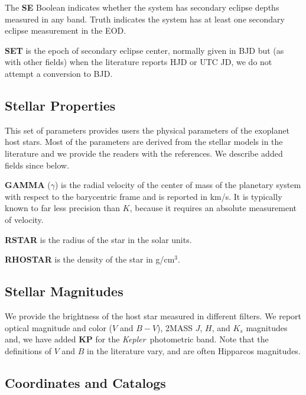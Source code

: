 \documentclass[11pt,preprint]{aastex}
\def\kepler{\textit{Kepler}}
\begin{document}
\begin{CJK*}{UTF8}{gbsn}
The {\bf SE} Boolean indicates whether the system has secondary
eclipse depths measured in any band.  Truth indicates the
system has at least one secondary eclipse measurement in the EOD.

{\bf SET} is the epoch of secondary eclipse center, normally given in
BJD but (as with other fields) when the literature reports HJD or UTC
JD, we do not attempt a conversion to BJD. 

\subsection{Stellar Properties}\label{sec:stellarprop}

This set of parameters provides users the physical parameters of
the exoplanet host stars.  Most of the parameters are derived from the
stellar models in the literature and we provide the readers with the
references. We describe added fields since \cite{Wright2011} below.

{\bf GAMMA} ($\gamma$) is the radial velocity of the center of mass of
the planetary system with respect to the barycentric frame and is
reported in km/s.  It is typically known to far less precision than
$K$, because it requires an absolute measurement of velocity.

{\bf RSTAR} is the radius of the star in the solar units.

{\bf RHOSTAR} is the density of the star in g/cm$^3$.

\subsection{Stellar Magnitudes}\label{sec:stellarmag}

We provide the brightness of the host star measured in different
filters. We report optical magnitude and color ($V$ and $B-V$),
2MASS $J$, $H$, and $K_s$ magnitudes and, we have added {\bf KP} for
the \kepler\ photometric band. Note that the definitions of $V$ and $B$ in the literature vary, and are often Hipparcos magnitudes.


\subsection{Coordinates and Catalogs}\label{sec:coord}


\end{CJK*}
\end{document}
